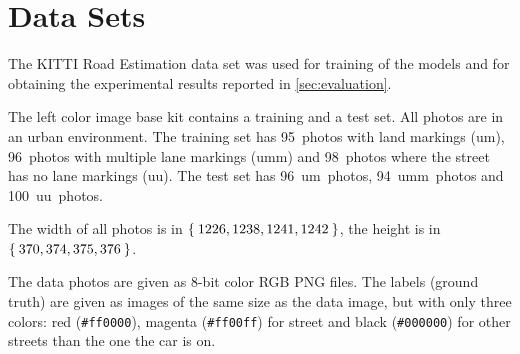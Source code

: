 
\section{Data Sets}\label{sec:datasets}
The KITTI Road Estimation data set \cite{Fritsch2013} was used for training of
the models and for obtaining the experimental results reported in
\cref{sec:evaluation}.

The left color image base kit contains a training and a test set. All photos
are in an urban environment. The training set has 95~photos with land markings
(um), 96~photos with multiple lane markings (umm) and 98~photos where the
street has no lane markings (uu). The test set has 96~um~photos, 94~umm~photos
and 100~uu~photos.

The width of all photos is in $\Set{1226, 1238, 1241, 1242}$, the height is in
$\Set{370, 374, 375, 376}$.

The data photos are given as 8-bit color RGB PNG files. The labels (ground
truth) are given as images of the same size as the data image, but with only
three colors: red (\verb+#ff0000+), magenta (\verb+#ff00ff+) for street and
black (\verb+#000000+) for other streets than the one the car is on.